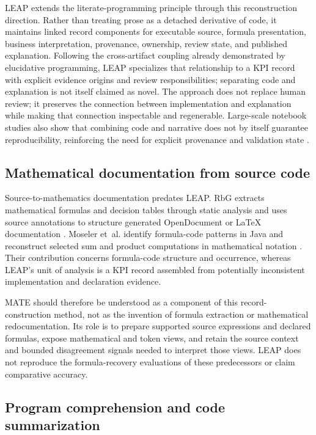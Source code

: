 \documentclass[a4paper,fleqn]{cas-dc}
\newcommand{\tool}{\textsc{LEAP}}
\begin{document}
\tool{} extends the literate-programming principle through this reconstruction direction. Rather than treating prose as a detached derivative of code, it maintains linked record components for executable source, formula presentation, business interpretation, provenance, ownership, review state, and published explanation. Following the cross-artifact coupling already demonstrated by elucidative programming, LEAP specializes that relationship to a KPI record with explicit evidence origins and review responsibilities; separating code and explanation is not itself claimed as novel. The approach does not replace human review; it preserves the connection between implementation and explanation while making that connection inspectable and regenerable. Large-scale notebook studies also show that combining code and narrative does not by itself guarantee reproducibility, reinforcing the need for explicit provenance and validation state \citep{Pimentel2019}.

\subsection{Mathematical documentation from source code}

Source-to-mathematics documentation predates LEAP. RbG extracts mathematical formulas and decision tables through static analysis and uses source annotations to structure generated OpenDocument or LaTeX documentation \citep{Moser2015}. Moseler et~al. identify formula-code patterns in Java and reconstruct selected sum and product computations in mathematical notation \citep{Moseler2021}. Their contribution concerns formula-code structure and occurrence, whereas LEAP's unit of analysis is a KPI record assembled from potentially inconsistent implementation and declaration evidence.

MATE should therefore be understood as a component of this record-construction method, not as the invention of formula extraction or mathematical redocumentation. Its role is to prepare supported source expressions and declared formulas, expose mathematical and token views, and retain the source context and bounded disagreement signals needed to interpret those views. LEAP does not reproduce the formula-recovery evaluations of these predecessors or claim comparative accuracy.

\subsection{Program comprehension and code summarization}
\end{document}
